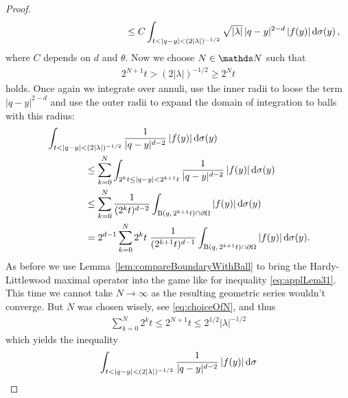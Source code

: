 \begin{proof}
\begin{align}
\begin{alignedat}{1}
       &\hspace{4cm}\leq C \int_{t < |q - y| < (2|\lambda|)^{-1/2}} \sqrt{|\lambda|} \, |q - y|^{2 - d}\, |f(y)| \d\sigma(y)\,,
     \end{alignedat}
   \end{align}
   where $C$ depends on $d$ and $\theta$. 
   Now we choose $N \in \N$ such that 
   \begin{align}
     \label{eq:choiceOfN}
     2^{N + 1} t > (2|\lambda|)^{-1/2} \geq 2^N t
   \end{align}
   holds. 
   Once again we integrate over annuli, use the inner radii to loose the term $|q - y|^{2 - d}$ and use the outer radii to expand the domain of integration to balls with this radius:
   \begin{align*}&\int_{t < |q - y| < (2|\lambda|)^{-1/2}} \frac{1}{|q - y|^{d - 2}} \, |f(y)| \, {\operatorname{d}\!{\sigma}}(y) \\
     &\qquad\qquad\leq \sum_{k = 0}^N \int_{2^kt \leq |q - y| < 2^{k + 1} t} \frac{1}{|q - y|^{d - 2}}\, |f(y)| \, {\operatorname{d}\!{\sigma}}(y) \\
     &\qquad\qquad\leq  \sum_{k = 0}^N \frac{1}{(2^{k}t)^{d - 2}}  \int_{\mathrm{B}(q,\, 2^{k + 1}t) \cap \partial\Omega} |f(y)| \, {\operatorname{d}\!{\sigma}}(y) \\
     &\qquad\qquad =  2^{d-1} \sum_{k = 0}^N 2^k t \;  \frac{1}{(2^{k + 1}t)^{d - 1}}  \int_{\mathrm{B}(q,\, 2^{k + 1}t) \cap \partial\Omega} |f(y)| \, {\operatorname{d}\!{\sigma}}(y).
   \end{align*}
   As before we use Lemma~\ref{lem:compareBoundaryWithBall} to bring the Hardy-Littlewood maximal operator into the game like for inequality \eqref{eq:applLem31}.
   This time we cannot take $N \to \infty$ as the resulting geometric series wouldn't converge. 
   But $N$ was chosen wisely, see \eqref{eq:choiceOfN}, and thus
   \begin{align*}
     \sum_{k = 0}^N 2^k t \leq 2^{N + 1} t \leq 2^{1/2} |\lambda|^{-1/2}
   \end{align*}
   which yields the inequality
   \begin{align*}\int_{t < |q - y| < (2|\lambda|)^{-1/2}} \frac{1}{|q - y|^{d - 2}} \, |f(y)| \d\sigma

\end{align*}
\end{proof}
